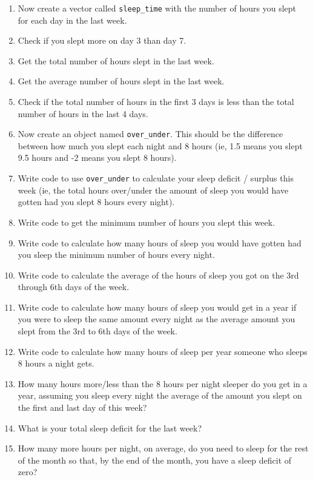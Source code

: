 \documentclass[
]{book}
\begin{document}
\begin{enumerate}
\def\labelenumi{\arabic{enumi}.}
\setcounter{enumi}{28}
\item
  Now create a vector called \texttt{sleep\_time} with the number of hours you slept for each day in the last week.
\item
  Check if you slept more on day 3 than day 7.
\item
  Get the total number of hours slept in the last week.
\item
  Get the average number of hours slept in the last week.
\item
  Check if the total number of hours in the first 3 days is less than the total number of hours in the last 4 days.
\item
  Now create an object named \texttt{over\_under}. This should be the difference between how much you slept each night and 8 hours (ie, 1.5 means you slept 9.5 hours and -2 means you slept 8 hours).
\item
  Write code to use \texttt{over\_under} to calculate your sleep deficit / surplus this week (ie, the total hours over/under the amount of sleep you would have gotten had you slept 8 hours every night).
\item
  Write code to get the minimum number of hours you slept this week.
\item
  Write code to calculate how many hours of sleep you would have gotten had you sleep the minimum number of hours every night.
\item
  Write code to calculate the average of the hours of sleep you got on the 3rd through 6th days of the week.
\item
  Write code to calculate how many hours of sleep you would get in a year if you were to sleep the same amount every night as the average amount you slept from the 3rd to 6th days of the week.
\item
  Write code to calculate how many hours of sleep per year someone who sleeps 8 hours a night gets.
\item
  How many hours more/less than the 8 hours per night sleeper do you get in a year, assuming you sleep every night the average of the amount you slept on the first and last day of this week?
\item
  What is your total sleep deficit for the last week?
\item
  How many more hours per night, on average, do you need to sleep for the rest of the month so that, by the end of the month, you have a sleep deficit of zero?
\end{enumerate}
\end{document}
